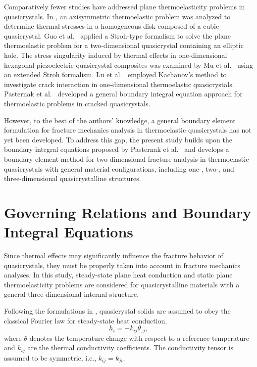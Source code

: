 Comparatively fewer studies have addressed plane thermoelasticity
problems in quasicrystals. In \cite{Kushnir6}, an axisymmetric
thermoelastic problem was analyzed to determine thermal stresses in
a homogeneous disk composed of a cubic quasicrystal. Guo et
al.~\cite{Kushnir22} applied a Stroh-type formalism to solve the plane
thermoelastic problem for a two-dimensional quasicrystal containing
an elliptic hole. The stress singularity induced by thermal effects
in one-dimensional hexagonal piezoelectric quasicrystal composites
was examined by Mu et al.~\cite{Kushnir23} using an extended Stroh
formalism. Lu et al.~\cite{Kushnir38} employed Kachanov's method to
investigate crack interaction in one-dimensional thermoelastic
quasicrystals. Pasternak et al.~\cite{Kushnir34} developed a general
boundary integral equation approach for thermoelastic problems in
cracked quasicrystals.

However, to the best of the authors' knowledge, a general boundary
element formulation for fracture mechanics analysis in thermoelastic
quasicrystals has not yet been developed. To address this gap, the
present study builds upon the boundary integral equations proposed
by Pasternak et al.~\cite{Kushnir34} and develops a boundary element
method for two-dimensional fracture analysis in thermoelastic
quasicrystals with general material configurations, including
one-, two-, and three-dimensional quasicrystalline structures.

\section{Governing Relations and Boundary Integral Equations}

Since thermal effects may significantly influence the fracture
behavior of quasicrystals, they must be properly taken into account
in fracture mechanics analyses. In this study, steady-state plane heat
conduction and static plane thermoelasticity problems are considered
for quasicrystalline materials with a general three-dimensional
internal structure.

Following the formulations in \cite{Kushnir6,Kushnir21}, quasicrystal
solids are assumed to obey the classical Fourier law for steady-state
heat conduction,
\begin{equation}
	h_i = -k_{ij}\theta_{,j},
	\label{KushnirEq1}
\end{equation}
where $\theta$ denotes the temperature change with respect to a
reference temperature and $k_{ij}$ are the thermal conductivity
coefficients. The conductivity tensor is assumed to be symmetric,
i.e., $k_{ij}=k_{ji}$.

